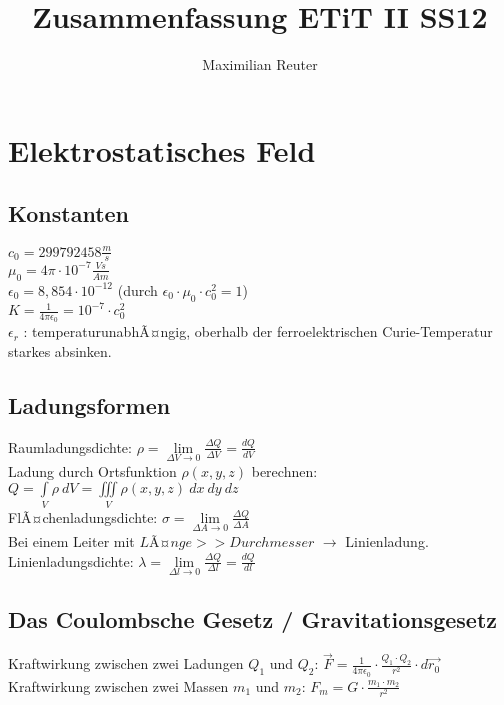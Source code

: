 \documentclass[a4paper,twoside,12pt]{report}
\begin{document}
\title{Zusammenfassung ETiT II SS12}
\author{Maximilian Reuter}

\maketitle
\tableofcontents

\chapter{Elektrostatisches Feld}

\section{Konstanten}

$c_0 = 299 792 458 \frac{m}{s}$\\
$\mu_0 = 4\pi \cdot 10^{-7} \frac{Vs}{Am}$\\
$\epsilon_0 = 8,854 \cdot 10^{-12}$ (durch $\epsilon_0 \cdot \mu_0 \cdot c^2_0 = 1$)\\
$K = \frac{1}{4\pi\epsilon_0} = 10^{-7} \cdot c^2_0$\\
$\epsilon_r$ : temperaturunabhÃ¤ngig, oberhalb der ferroelektrischen Curie-Temperatur starkes absinken.\\


\section{Ladungsformen}

Raumladungsdichte: $\rho = \lim\limits_{\Delta V \to 0} {\frac{\Delta Q}{\Delta V} = \frac{dQ}{dV}}$\\
Ladung durch Ortsfunktion $\rho(x,y,z)$ berechnen: $Q = \int\limits_V {\rho\ dV} = \iiint\limits_V{\rho(x,y,z)\ dx\ dy\ dz}$\\
FlÃ¤chenladungsdichte: $\sigma = \lim\limits_{\Delta A \to 0}{\frac{\Delta Q}{\Delta A}}$\\
Bei einem Leiter mit $LÃ¤nge >> Durchmesser$ $\rightarrow$ Linienladung.\\
Linienladungsdichte: $\lambda = \lim\limits_{\Delta l \to 0}{\frac{\Delta Q}{\Delta l}} = \frac{dQ}{dl}$

\section{Das Coulombsche Gesetz / Gravitationsgesetz}
Kraftwirkung zwischen zwei Ladungen $Q_1$ und $Q_2$: $\vec{F} = \frac{1}{4\pi \epsilon_0}\cdot \frac{Q_1 \cdot Q_2}{r^2}\cdot d\vec{r_{0}}$\\
Kraftwirkung zwischen zwei Massen $m_1$ und $m_2$: $F_m = G\cdot \frac{m_1 \cdot m_2}{r^2}$
\end{document}
